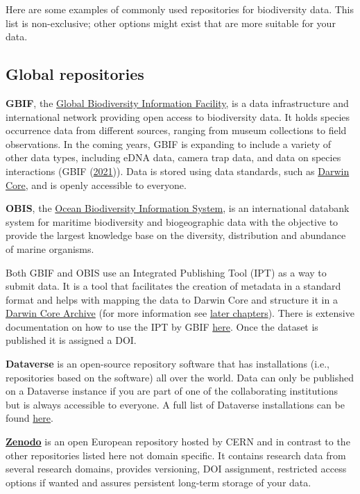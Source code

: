 \documentclass[
]{book}
\begin{document}
Here are some examples of commonly used repositories for biodiversity data. This list is non-exclusive; other options might exist that are more suitable for your data.

\hypertarget{global-repositories}{%
\subsection{Global repositories}\label{global-repositories}}

\textbf{GBIF}, the \href{http://gbif.org}{Global Biodiversity Information Facility}, is a data infrastructure and international network providing open access to biodiversity data. It holds species occurrence data from different sources, ranging from museum collections to field observations. In the coming years, GBIF is expanding to include a variety of other data types, including eDNA data, camera trap data, and data on species interactions (GBIF (\protect\hyperlink{ref-GBIF_2021}{2021})). Data is stored using data standards, such as \protect\hyperlink{DwC}{Darwin Core}, and is openly accessible to everyone.

\textbf{OBIS}, the \href{https://obis.org/}{Ocean Biodiversity Information System}, is an international databank system for maritime biodiversity and biogeographic data with the objective to provide the largest knowledge base on the diversity, distribution and abundance of marine organisms.

Both GBIF and OBIS use an Integrated Publishing Tool (IPT) as a way to submit data. It is a tool that facilitates the creation of metadata in a standard format and helps with mapping the data to Darwin Core and structure it in a \protect\hyperlink{DwC-A}{Darwin Core Archive} (for more information see \protect\hyperlink{darwin-core-archive}{later chapters}). There is extensive documentation on how to use the IPT by GBIF \href{https://ipt.gbif.org/manual/en/ipt/latest/dwca-guide}{here}. Once the dataset is published it is assigned a DOI.

\textbf{Dataverse} is an open-source repository software that has installations (i.e., repositories based on the software) all over the world. Data can only be published on a Dataverse instance if you are part of one of the collaborating institutions but is always accessible to everyone. A full list of Dataverse installations can be found \href{https://dataverse.org/installations}{here}.

\href{https://zenodo.org/}{\textbf{Zenodo}} is an open European repository hosted by CERN and in contrast to the other repositories listed here not domain specific. It contains research data from several research domains, provides versioning, DOI assignment, restricted access options if wanted and assures persistent long-term storage of your data.
\end{document}
